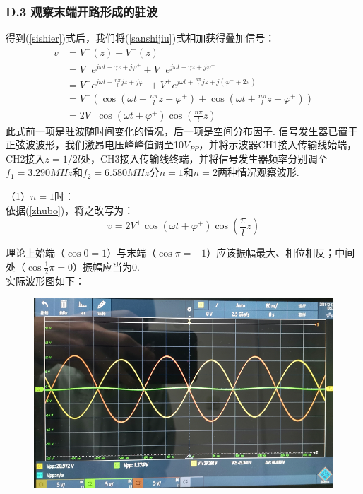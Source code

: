 \documentclass[UTF8]{ctexart}
\begin{document}
\subsubsection*{D.3 观察末端开路形成的驻波}
得到(\ref{sishier})式后，我们将(\ref{sanshijiu})式相加获得叠加信号：
\begin{equation}
    \begin{aligned}
        v&=V^+(z)+V^-(z)\\ 
        &=V^+e^{j\omega t-\gamma z+j\varphi^+}+V^- e^{j\omega t+\gamma z+j\varphi^-}\\
        &=V^+e^{j\omega t-\frac{n\pi}{l}j z+j\varphi^+}+V^+ e^{j\omega t+\frac{n\pi}{l}j z+j(\varphi^++2\pi)}\\
        &=V^+(\cos(\omega t-\frac{n\pi}{l}z+\varphi^+)+\cos(\omega t+\frac{n\pi}{l}z+\varphi^+))\\
        &=2V^+\cos(\omega t+\varphi^+)\cos(\frac{n\pi}{l}z)
    \end{aligned}
    \label{zhubo}
\end{equation}
此式前一项是驻波随时间变化的情况，后一项是空间分布因子. 信号发生器已置于正弦波波形，我们激昂电压峰峰值调至10$V_{PP}$，并将示波器CH1接入传输线始端，CH2接入$z=1/2l$处，CH3接入传输线终端，并将信号发生器频率分别调至$f_1=3.290MHz$和$f_2=6.580MHz$分$n=1$和$n=2$两种情况观察波形.\par


（1）$n=1$时：\\

依据(\ref{zhubo})，将之改写为：
\begin{equation}
    v=2V^+\cos(\omega t+\varphi^+)\cos(\frac{\pi}{l}z)
    \label{n=1}
\end{equation}\par
理论上始端（$\cos{0}=1$）与末端（$\cos{\pi}=-1$）应该振幅最大、相位相反；中间处（$\cos{\frac{1}{2}\pi}=0$）振幅应当为0. \\
实际波形图如下：

\begin{figure}[H]\begin{center}
    \includegraphics[scale=0.7]{21.PNG}
\end{center}\end{figure}
\end{document}
